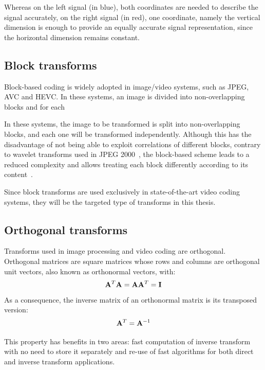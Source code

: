 \documentclass[11pt,a4paper,openright,twoside]{book}
\numberwithin{equation}{section} %
\numberwithin{figure}{section} %
\numberwithin{table}{section} %
\begin{document}
Whereas on the left signal (in blue), both coordinates are needed to describe
the signal accurately, on the right signal (in red), one coordinate, namely
the vertical dimension is enough to provide an equally accurate signal
representation, since the horizontal dimension remains constant.

\subsection{Block transforms}
\label{sub:block_transforms}

Block-based coding is widely adopted in image/video systems, such as
\acs{JPEG}, \ac{AVC} and \ac{HEVC}.
In these systems, an image is divided into non-overlapping blocks and for each

In these systems, the image to be transformed is split into non-overlapping
blocks, and each one will be transformed independently.
Although this has the disadvantage of not being able to exploit correlations
of different blocks, contrary to wavelet transforms used in \acs{JPEG}
2000~\cite{jpeg2000}, the block-based scheme leads to a reduced complexity and
allows treating each block differently according to its
content~\cite{xu-09-intra-predictive-transforms}.

Since block transforms are used exclusively in state-of-the-art video coding
systems, they will be the targeted type of transforms in this thesis.

\subsection{Orthogonal transforms}
\label{sub:orthogonal_transforms}

Transforms used in image processing and video coding are orthogonal.
Orthogonal matrices are square matrices whose rows and columns are orthogonal
unit vectors, also known as orthonormal vectors, with:
\begin{equation}
	\mathbf{A}^T\mathbf{A} = \mathbf{A}\mathbf{A}^T = \mathbf{I}
\end{equation}
As a consequence, the inverse matrix of an orthonormal matrix is its
transposed version:
\begin{equation}
	\mathbf{A}^T = \mathbf{A}^{-1}
\end{equation}

This property has benefits in two areas: fast computation of inverse transform
with no need to store it separately and re-use of fast algorithms for both
direct and inverse transform applications.
\end{document}
